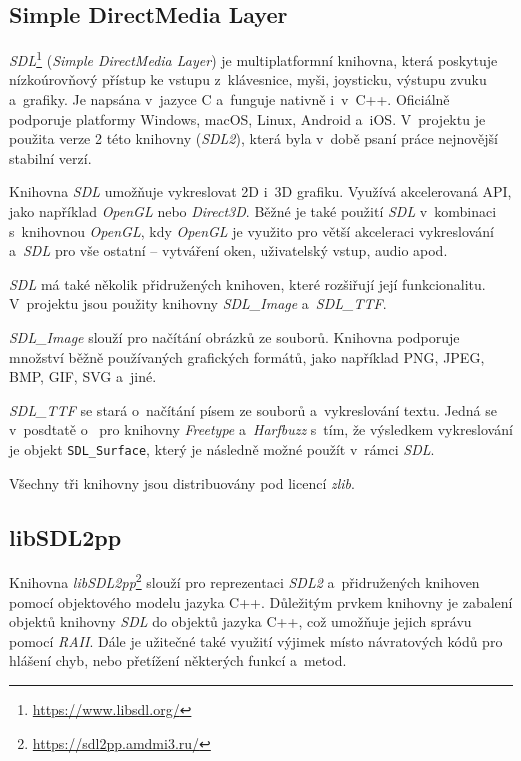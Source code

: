 \subsection*{Simple DirectMedia Layer}

\emph{SDL}\footnote{\url{https://www.libsdl.org/}} (\emph{Simple DirectMedia Layer}) je multiplatformní knihovna, která poskytuje nízkoúrovňový přístup ke vstupu z~klávesnice, myši, joysticku, výstupu zvuku a~grafiky. Je napsána v~jazyce C a~funguje nativně i~v~C++. Oficiálně podporuje platformy Windows, macOS, Linux, Android a~iOS. V~projektu je použita verze 2 této knihovny (\emph{SDL2}), která byla v~době psaní práce nejnovější stabilní verzí.

Knihovna \emph{SDL} umožňuje vykreslovat 2D i~3D grafiku. Využívá akcelerovaná API, jako například \emph{OpenGL} nebo \emph{Direct3D}. Běžné je také použití \emph{SDL} v~kombinaci s~knihovnou \emph{OpenGL}, kdy \emph{OpenGL} je využito pro větší akceleraci vykreslování a~\emph{SDL} pro vše ostatní -- vytváření oken, uživatelský vstup, audio apod.

\emph{SDL} má také několik přidružených knihoven, které rozšiřují její funkcionalitu. V~projektu jsou použity knihovny \emph{SDL\_Image} a~\emph{SDL\_TTF}.

\emph{SDL\_Image} slouží pro načítání obrázků ze souborů. Knihovna podporuje množství běžně používaných grafických formátů, jako například PNG, JPEG, BMP, GIF, SVG a~jiné.

\emph{SDL\_TTF} se stará o~načítání písem ze souborů a~vykreslování textu. Jedná se v~posdtatě o~ pro knihovny \emph{Freetype} a~\emph{Harfbuzz} s~tím, že výsledkem vykreslování je objekt \texttt{SDL\_Surface}, který je následně možné použít v~rámci \emph{SDL}.

Všechny tři knihovny jsou distribuovány pod licencí \emph{zlib}.

\subsection*{libSDL2pp}

Knihovna \emph{libSDL2pp}\footnote{\url{https://sdl2pp.amdmi3.ru/}} slouží pro reprezentaci \emph{SDL2} a~přidružených knihoven pomocí objektového modelu jazyka C++. Důležitým prvkem knihovny je zabalení objektů knihovny \emph{SDL} do objektů jazyka C++, což umožňuje jejich správu pomocí \emph{RAII}. Dále je užitečné také využití výjimek místo návratových kódů pro hlášení chyb, nebo přetížení některých funkcí a~metod.

